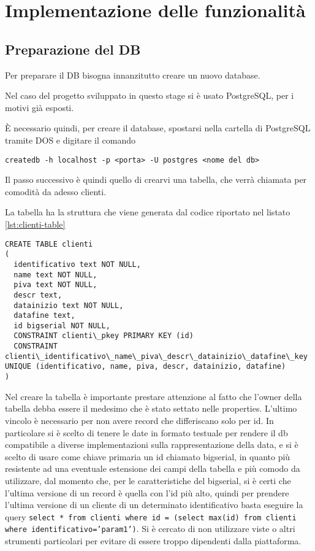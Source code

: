\section{Implementazione delle funzionalità}
\subsection{Preparazione del DB}
Per preparare il DB bisogna innanzitutto creare un nuovo database.

Nel caso del progetto sviluppato in questo stage si è usato PostgreSQL, per i motivi già esposti.

È necessario quindi, per creare il database, spostarsi nella cartella di PostgreSQL tramite DOS e digitare il comando

\texttt{createdb -h localhost -p <porta> -U postgres <nome del db>}

Il passo successivo è quindi quello di crearvi una tabella, che verrà chiamata per comodità da adesso clienti.

La tabella ha la struttura che viene generata dal codice riportato nel listato \ref{lst:clienti-table}
\begin{lstlisting}[caption=codice per la creazione della cartella clienti, label=lst:clienti-table]
CREATE TABLE clienti
(
  identificativo text NOT NULL,
  name text NOT NULL,
  piva text NOT NULL,
  descr text,
  datainizio text NOT NULL,
  datafine text,
  id bigserial NOT NULL,
  CONSTRAINT clienti\_pkey PRIMARY KEY (id)
  CONSTRAINT clienti\_identificativo\_name\_piva\_descr\_datainizio\_datafine\_key UNIQUE (identificativo, name, piva, descr, datainizio, datafine)
)
\end{lstlisting}
Nel creare la tabella è importante prestare attenzione al fatto che l'owner della tabella debba essere il medesimo che è stato settato nelle properties.
L’ultimo vincolo è necessario per non avere record che differiscano solo per id.
In particolare si è scelto di tenere le date in formato testuale per rendere il db compatibile a diverse implementazioni sulla rappresentazione della data, e si è scelto di usare come chiave primaria un id chiamato bigserial, in quanto più resistente ad una eventuale estensione dei campi della tabella e più comodo da utilizzare, dal momento che, per le caratteristiche del bigserial, si è certi che l’ultima versione di un record è quella con l’id più alto, quindi per prendere l’ultima versione di un cliente di un determinato  identificativo basta eseguire la query \texttt{select * from clienti where id = (select max(id) from clienti where identificativo='param1')}. Si è cercato di non utilizzare viste o altri strumenti particolari per evitare di essere troppo dipendenti dalla piattaforma.




